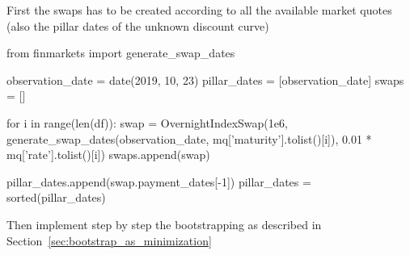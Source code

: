 First the swaps has to be created according to all the available market quotes (also the pillar dates of the unknown discount curve)

\begin{ipython}
from finmarkets import generate_swap_dates

observation_date = date(2019, 10, 23)
pillar_dates = [observation_date]
swaps = []

for i in range(len(df)):
    swap = OvernightIndexSwap(1e6,
             generate_swap_dates(observation_date,
             mq['maturity'].tolist()[i]),
             0.01 * mq['rate'].tolist()[i])
    swaps.append(swap)

pillar_dates.append(swap.payment_dates[-1])
pillar_dates = sorted(pillar_dates)
\end{ipython}

Then implement step by step the bootstrapping as described in Section~\ref{sec:bootstrap_as_minimization}

